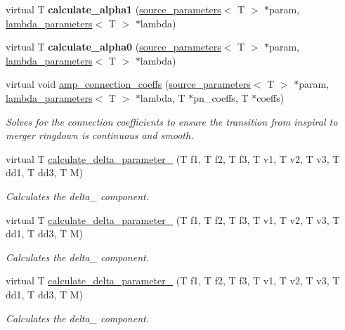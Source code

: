 \begin{DoxyCompactItemize}
virtual T {\bfseries calculate\+\_\+alpha1} (\hyperlink{structsource__parameters}{source\+\_\+parameters}$<$ T $>$ $\ast$param, \hyperlink{structlambda__parameters}{lambda\+\_\+parameters}$<$ T $>$ $\ast$lambda)
\item 
\mbox{\label{classIMRPhenomD_aa8686f48edea51188f5a9168009ad677}} 
virtual T {\bfseries calculate\+\_\+alpha0} (\hyperlink{structsource__parameters}{source\+\_\+parameters}$<$ T $>$ $\ast$param, \hyperlink{structlambda__parameters}{lambda\+\_\+parameters}$<$ T $>$ $\ast$lambda)
\item 
\mbox{\label{classIMRPhenomD_aa945ea05c7846632798d29c88ae85ac9}} 
virtual void \hyperlink{classIMRPhenomD_aa945ea05c7846632798d29c88ae85ac9}{amp\+\_\+connection\+\_\+coeffs} (\hyperlink{structsource__parameters}{source\+\_\+parameters}$<$ T $>$ $\ast$param, \hyperlink{structlambda__parameters}{lambda\+\_\+parameters}$<$ T $>$ $\ast$lambda, T $\ast$pn\+\_\+coeffs, T $\ast$coeffs)
\begin{DoxyCompactList}\small\item\em Solves for the connection coefficients to ensure the transition from inspiral to merger ringdown is continuous and smooth. \end{DoxyCompactList}\item 
virtual T \hyperlink{classIMRPhenomD_abd81c0aa321c96077823483c91ae01d4}{calculate\+\_\+delta\+\_\+parameter\+\_} (T f1, T f2, T f3, T v1, T v2, T v3, T dd1, T dd3, T M)
\begin{DoxyCompactList}\small\item\em Calculates the delta\+\_ component. \end{DoxyCompactList}\item 
virtual T \hyperlink{classIMRPhenomD_a6fd680e8cace47a635e7c3956dfb4b32}{calculate\+\_\+delta\+\_\+parameter\+\_} (T f1, T f2, T f3, T v1, T v2, T v3, T dd1, T dd3, T M)
\begin{DoxyCompactList}\small\item\em Calculates the delta\+\_ component. \end{DoxyCompactList}\item 
virtual T \hyperlink{classIMRPhenomD_acc1918553367dbe59ffb4959b0a0f5b2}{calculate\+\_\+delta\+\_\+parameter\+\_} (T f1, T f2, T f3, T v1, T v2, T v3, T dd1, T dd3, T M)
\begin{DoxyCompactList}\small\item\em Calculates the delta\+\_ component. \end{DoxyCompactList}\item 

\end{DoxyCompactItemize}
